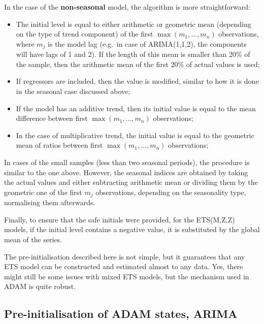 \documentclass[
]{book}
\providecommand{\tightlist}{%
  \setlength{\itemsep}{0pt}\setlength{\parskip}{0pt}}
\theoremstyle{definition}
\theoremstyle{definition}
\theoremstyle{definition}
\theoremstyle{definition}
\theoremstyle{remark}
\begin{document}
In the case of the \textbf{non-seasonal} model, the algorithm is more straightforward:

\begin{itemize}
\tightlist
\item
  The initial level is equal to either arithmetic or geometric mean (depending on the type of trend component) of the first \(\max(m_1,\dots,m_n)\) observations, where \(m_j\) is the model lag (e.g.~in case of ARIMA(1,1,2), the components will have lags of 1 and 2). If the length of this mean is smaller than 20\% of the sample, then the arithmetic mean of the first 20\% of actual values is used;
\item
  If regressors are included, then the value is modified, similar to how it is done in the seasonal case discussed above;
\item
  If the model has an additive trend, then its initial value is equal to the mean difference between first \(\max(m_1,\dots,m_n)\) observations;
\item
  In the case of multiplicative trend, the initial value is equal to the geometric mean of ratios between first \(\max(m_1,\dots,m_n)\) observations;
\end{itemize}

In cases of the small samples (less than two seasonal periods), the procedure is similar to the one above. However, the seasonal indices are obtained by taking the actual values and either subtracting arithmetic mean or dividing them by the geometric one of the first \(m_j\) observations, depending on the seasonality type, normalising them afterwards.

Finally, to ensure that the safe initials were provided, for the ETS(M,Z,Z) models, if the initial level contains a negative value, it is substituted by the global mean of the series.

The pre-initialisation described here is not simple, but it guarantees that any ETS model can be constructed and estimated almost to any data. Yes, there might still be some issues with mixed ETS models, but the mechanism used in ADAM is quite robust.

\hypertarget{pre-initialisation-of-adam-states-arima}{%
\subsection{Pre-initialisation of ADAM states, ARIMA}\label{pre-initialisation-of-adam-states-arima}}
\end{document}
